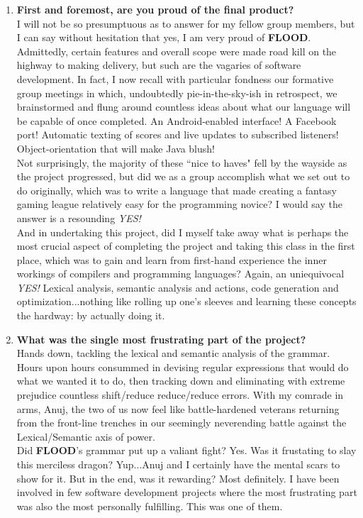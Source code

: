 \documentclass[12pt]{report}
\begin{document}
\begin{enumerate}
\item \textbf{First and foremost, are you proud of the final product?}\\
I will not be so presumptuous as to answer for my fellow group members, but I can say without hesitation that yes, I am very proud of \textbf{FLOOD}. Admittedly, certain features and overall scope were made road kill on the highway to making delivery, but such are the vagaries of software development. In fact, I now recall with particular fondness our formative group meetings in which, undoubtedly pie-in-the-sky-ish in retrospect, we brainstormed and flung around countless ideas about what our language will be capable of once completed. An Android-enabled interface! A Facebook port! Automatic texting of scores and live updates to subscribed listeners! Object-orientation that will make Java blush!\\
Not surprisingly, the majority of these ``nice to haves" fell by the wayside as the project progressed, but did we as a group accomplish what we set out to do originally, which was to write a language that made creating a fantasy gaming league relatively easy for the programming novice? I would say the answer is a resounding \textit{YES!}\\
And in undertaking this project, did I myself take away what is perhaps the most crucial aspect of completing the project and taking this class in the first place, which was to gain and learn from first-hand experience the inner workings of compilers and programming languages? Again, an uniequivocal \textit{YES!} Lexical analysis, semantic analysis and actions, code generation and optimization...nothing like rolling up one's sleeves and learning these concepts the hardway: by actually doing it.
\item \textbf{What was the single most frustrating part of the project?}\\
Hands down, tackling the lexical and semantic analysis of the grammar. Hours upon hours consummed in devising regular expressions that would do what we wanted it to do, then tracking down and eliminating with extreme prejudice countless shift/reduce reduce/reduce errors. With my comrade in arms, Anuj, the two of us now feel like battle-hardened veterans returning from the front-line trenches in our seemingly neverending battle against the Lexical/Semantic axis of power.\\
Did \textbf{FLOOD}'s grammar put up a valiant fight? Yes. Was it frustating to slay this merciless dragon? Yup...Anuj and I certainly have the mental scars to show for it. But in the end, was it rewarding? Most definitely. I have been involved in few software development projects where the most frustrating part was also the most personally fulfilling. This was one of them.

\end{enumerate}
\end{document}
